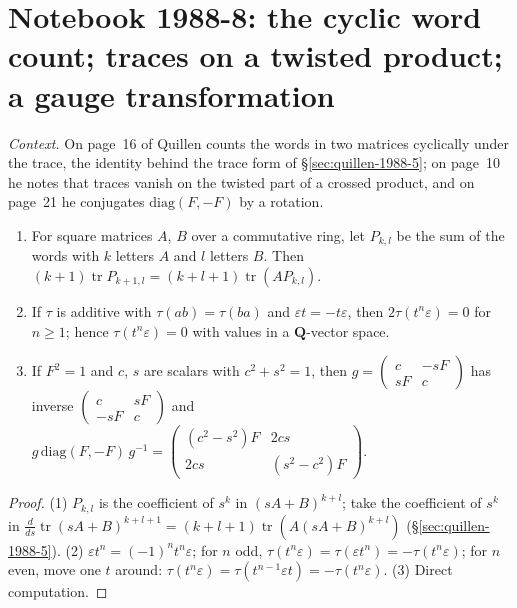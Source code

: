 \section[Notebook 1988-8: the cyclic word count]{Notebook 1988-8: the cyclic word count; traces on a twisted product; a gauge transformation\protect{}}\label{sec:quillen-1988-8}

\emph{Context.} On page~16 of  Quillen counts the words in two matrices cyclically under the trace, the identity behind the trace form of \S\ref{sec:quillen-1988-5}; on page~10 he notes that traces vanish on the twisted part of a crossed product, and on page~21 he conjugates $\mathrm{diag}(F, -F)$ by a rotation.

\begin{encadre}
\begin{theoreme}\label{thm:quillen-1988-8}\leavevmode
\begin{enumerate}
\item For square matrices $A$, $B$ over a commutative ring, let $P_{k,l}$ be the sum of the words with $k$ letters $A$ and $l$ letters $B$. Then $(k+1)\operatorname{tr}P_{k+1,l} = (k+l+1)\operatorname{tr}(AP_{k,l})$.
\item If $\tau$ is additive with $\tau(ab) = \tau(ba)$ and $\varepsilon t = -t\varepsilon$, then $2\tau(t^n\varepsilon) = 0$ for $n \ge 1$; hence $\tau(t^n\varepsilon) = 0$ with values in a $\mathbf Q$-vector space.
\item If $F^2 = 1$ and $c$, $s$ are scalars with $c^2 + s^2 = 1$, then $g = \begin{pmatrix}c & -sF\\ sF & c\end{pmatrix}$ has inverse $\begin{pmatrix}c & sF\\ -sF & c\end{pmatrix}$ and $g\,\mathrm{diag}(F, -F)\,g^{-1} = \begin{pmatrix}(c^2-s^2)F & 2cs\\ 2cs & (s^2-c^2)F\end{pmatrix}$.
\end{enumerate}
\end{theoreme}
\end{encadre}

\begin{proof}
(1) $P_{k,l}$ is the coefficient of $s^k$ in $(sA + B)^{k+l}$; take the coefficient of $s^k$ in $\frac d{ds}\operatorname{tr}(sA + B)^{k+l+1} = (k+l+1)\operatorname{tr}(A(sA + B)^{k+l})$ (\S\ref{sec:quillen-1988-5}). (2) $\varepsilon t^n = (-1)^nt^n\varepsilon$; for $n$ odd, $\tau(t^n\varepsilon) = \tau(\varepsilon t^n) = -\tau(t^n\varepsilon)$; for $n$ even, move one $t$ around: $\tau(t^n\varepsilon) = \tau(t^{n-1}\varepsilon t) = -\tau(t^n\varepsilon)$. (3) Direct computation.
\end{proof}

